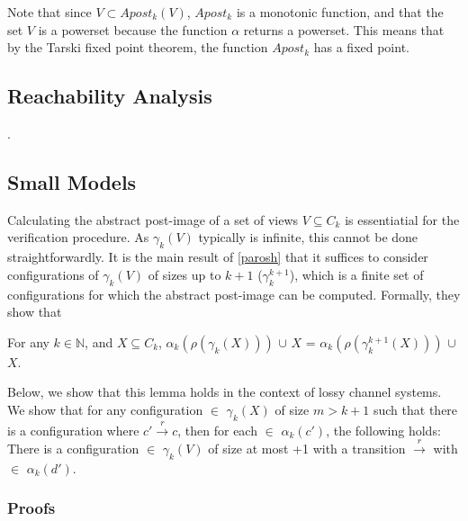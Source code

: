 Note that since $V \subset Apost_k(V)$, $Apost_k$ is a monotonic function, and that the set $V$ is a powerset because the function $\alpha$ returns a powerset. This means that by the Tarski fixed point theorem, the function $Apost_k$ has a fixed point.

\subsection{Reachability Analysis}
.


\subsection{Small Models}
\label{proof}
Calculating the abstract post-image of a set of views $V \subseteq C_k$ is essentiatial for the verification procedure. As $\gamma_k(V)$ typically is infinite, this cannot be done straightforwardly. It is the main result of \ref{parosh} that it suffices to consider configurations of $\gamma_k(V)$ of sizes up to $k+1$ ($\gamma_k^{k+1}$), which is a finite set of configurations for which the abstract post-image can be computed. Formally, they show that

\begin{lemma}
\label{lemma1}
For any $k\in\mathbb{N}$, and $X\subseteq C_k$, $\alpha_k(\rho(\gamma_k(X)))$ $\cup$ $X$ = $\alpha_k(\rho(\gamma_k^{k+1}(X)))$ $\cup$ $X$.
\end{lemma}

Below, we show that this lemma holds in the context of lossy channel systems. We show that for any configuration  $\in$ $\gamma_k(X)$ of size $m > k + 1$ such that there is a configuration  where $c' \xrightarrow{r} c$, then for each  $\in$ $\alpha_k(c')$, the following holds: There is a configuration  $\in$ $\gamma_k(V)$ of size at most +1 with a transition  $\xrightarrow{r}$  with  $\in$ $\alpha_k(d')$.

\subsubsection{Proofs}

